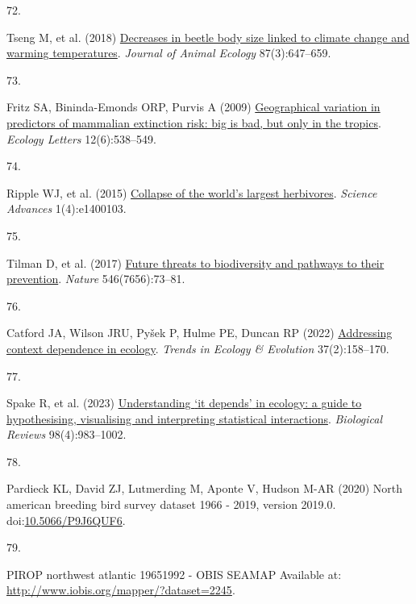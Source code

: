 \documentclass{article}
\newlength{\cslhangindent}
\newlength{\csllabelwidth}
\newlength{\cslentryspacingunit} %
\newenvironment{CSLReferences}[2] %
 {%
  \setlength{\parindent}{0pt}
  \ifodd #1
  \let\oldpar\par
  \def\par{\hangindent=\cslhangindent\oldpar}
  \fi
  \setlength{\parskip}{#2\cslentryspacingunit}
 }%
 {}
\newcommand{\CSLLeftMargin}[1]{\parbox[t]{\csllabelwidth}{#1}}
\newcommand{\CSLRightInline}[1]{\parbox[t]{\linewidth - \csllabelwidth}{#1}\break}
\begin{document}
\begin{CSLReferences}{0}{0}
\leavevmode{}%
\CSLLeftMargin{72. }%
\CSLRightInline{Tseng M, et al. (2018)
\href{https://doi.org/10.1111/1365-2656.12789}{Decreases in beetle body
size linked to climate change and warming temperatures}. \emph{Journal
of Animal Ecology} 87(3):647--659.}

\leavevmode{}%
\CSLLeftMargin{73. }%
\CSLRightInline{Fritz SA, Bininda-Emonds ORP, Purvis A (2009)
\href{https://doi.org/10.1111/j.1461-0248.2009.01307.x}{Geographical
variation in predictors of mammalian extinction risk: big is bad, but
only in the tropics}. \emph{Ecology Letters} 12(6):538--549.}

\leavevmode{}%
\CSLLeftMargin{74. }%
\CSLRightInline{Ripple WJ, et al. (2015)
\href{https://doi.org/10.1126/sciadv.1400103}{Collapse of the world{'}s
largest herbivores}. \emph{Science Advances} 1(4):e1400103.}

\leavevmode{}%
\CSLLeftMargin{75. }%
\CSLRightInline{Tilman D, et al. (2017)
\href{https://doi.org/10.1038/nature22900}{Future threats to
biodiversity and pathways to their prevention}. \emph{Nature}
546(7656):73--81.}

\leavevmode{}%
\CSLLeftMargin{76. }%
\CSLRightInline{Catford JA, Wilson JRU, Pyšek P, Hulme PE, Duncan RP
(2022) \href{https://doi.org/10.1016/j.tree.2021.09.007}{Addressing
context dependence in ecology}. \emph{Trends in Ecology \& Evolution}
37(2):158--170.}

\leavevmode{}%
\CSLLeftMargin{77. }%
\CSLRightInline{Spake R, et al. (2023)
\href{https://doi.org/10.1111/brv.12939}{Understanding {`}it depends{'}
in ecology: a guide to hypothesising, visualising and interpreting
statistical interactions}. \emph{Biological Reviews} 98(4):983--1002.}

\leavevmode{}%
\CSLLeftMargin{78. }%
\CSLRightInline{Pardieck KL, David ZJ, Lutmerding M, Aponte V, Hudson
M-AR (2020) North american breeding bird survey dataset 1966 - 2019,
version 2019.0.
doi:\href{https://doi.org/10.5066/P9J6QUF6}{10.5066/P9J6QUF6}.}

\leavevmode{}%
\CSLLeftMargin{79. }%
\CSLRightInline{PIROP northwest atlantic 1965{\textendash}1992 - OBIS
SEAMAP Available at: \url{http://www.iobis.org/mapper/?dataset=2245}.}


\end{CSLReferences}
\end{document}

